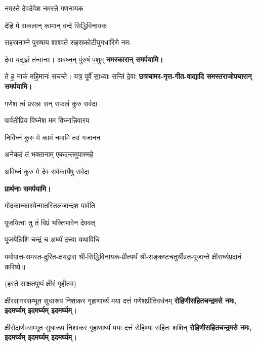 \begin{center}
{नमस्ते देवदेवेश नमस्ते गणनायक}

{देहि मे सकलान् कामान् वन्दे सिद्धिविनायक}

{सहस्रनाम्ने पुरुषाय शाश्वते सहस्रकोटीयुगधारिणे नमः}

{दे॒वा यद्य॒ज्ञं त॑न्वा॒नाः। अब॑ध्न॒न् पु॑रुषं प॒शुम्}
\textbf{\devAya{} नमस्कारान् समर्पयामि।}
\medskip

{ते ह॒ नाकं॑ महि॒मानः॑ सचन्ते। यत्र॒ पूर्वे॑ सा॒ध्याः सन्ति॑ दे॒वाः}
\textbf{\devAya{} छत्रचामर-नृत्त-गीत-वाद्यादि समस्तराजोपचारान् समर्पयामि।}
\medskip

{गणेश त्वं प्रसन्नः सन् सफलं कुरु सर्वदा}

{पार्वतीप्रिय विघ्नेश मम विघ्नान्निवारय}

{निर्विघ्नं कुरु मे कामं नमामि त्वां गजानन}

{अनेकदं तं भक्तानाम् एकदन्तमुपास्महे}

{अविघ्नं कुरु मे देव सर्वकार्येषु सर्वदा}

\textbf{प्रार्थनाः समर्पयामि।}

{मोदकान्कारयेन्मातस्तिलजान्दश पार्वति}

{पूजयित्वा तु तं विप्रं भक्तिभावेन देववत्}

{पूजयेन्निशि चन्द्रं च अर्घ्यं दत्त्वा यथाविधि}

\resetShloka
ममोपात्त-समस्त-दुरित-क्षयद्वारा श्री-सिद्धिविनायक-प्रीत्यर्थं श्री-सङ्कष्टचतुर्थीव्रत-पूजान्ते क्षीरार्घ्यप्रदानं करिष्ये॥

(हस्ते साक्षतपुष्पं क्षीरं गृहीत्वा)

\twolineshloka
{क्षीरसागरसम्भूत सुधारूप निशाकर}
{गृहाणार्घ्यं मया दत्तं गणेशप्रीतिवर्धनम्}
\textbf{रोहिणीसहितचन्द्रमसे नमः, इदमर्घ्यम् इदमर्घ्यम् इदमर्घ्यम्।}

\twolineshloka
{क्षीरोदार्णवसम्भूत सुधारूप निशाकर}
{गृहाणार्घ्यं मया दत्तं रोहिण्या सहितः शशिन्}
\textbf{रोहिणीसहितचन्द्रमसे नमः, इदमर्घ्यम् इदमर्घ्यम् इदमर्घ्यम्।}


\end{center}
